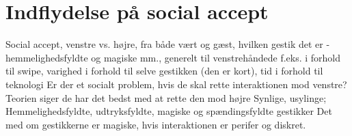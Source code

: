\section{Indflydelse på social accept}
\label{DiskussionSocialAccept}
%
Social accept, venstre vs. højre, fra både vært og gæst, hvilken gestik det er - hemmelighedsfyldte og magiske mm., generelt til venstrehåndede f.eks. i forhold til swipe, varighed i forhold til selve gestikken (den er kort), tid i forhold til teknologi
 Er der et socialt problem, hvis de skal rette interaktionen mod venstre? Teorien siger de har det bedst med at rette den mod højre
 Synlige, usylinge; Hemmelighedsfyldte, udtryksfyldte, 
	magiske og spændingsfyldte gestikker
	Det med om gestikkerne er magiske, hvis interaktionen er perifer og diskret. 
%